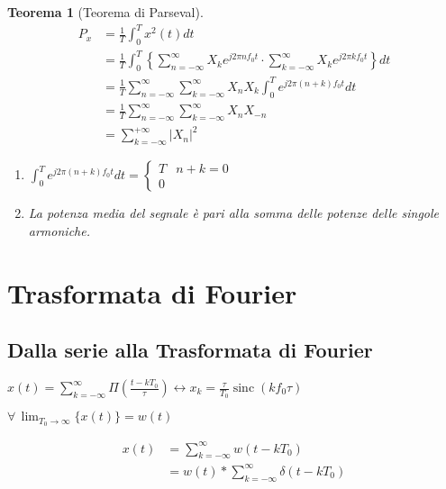\documentclass[a4paper,10pt]{article}
\theoremstyle{mystyle}
\newtheorem{theorem}{Teorema}[section]
\begin{document}
\begin{multicols}{2}
\begin{theorem}[Teorema di Parseval]
    \begin{align*}
        P_x
        &= \frac{1}{T} \int_{0}^{T} x^2 (t) dt \\
        &= \frac{1}{T} \int_{0}^{T} \left\{ \sum_{n=-\infty}^{\infty} X_k e^{j2 \pi n f_0 t}  \cdot \sum_{k=-\infty}^{\infty} X_k e^{j 2 \pi k f_0 t} \right\} dt \\
        &= \frac{1}{T} \sum_{n=-\infty}^{\infty} \sum_{k=-\infty}^{\infty} X_n X_k \int_{0}^{T} e^{j2 \pi (n+k)f_0 t} dt \\
        &= \frac{1}{T} \sum_{n=-\infty}^{\infty} \sum_{k=-\infty}^{\infty} X_n X_{-n} \\
        &= \sum_{k=-\infty}^{+\infty} \lvert X_n \rvert ^2
    \end{align*}

    \begin{enumerate}[label=\roman*.]
        \item
           \(\int_{0}^{T} e^{j 2 \pi (n+k) f_0 t} dt =
           \begin{cases}
            T & n+k=0 \\
            0
           \end{cases}\)
        \item La potenza media del segnale è pari alla somma delle potenze delle singole armoniche.
    \end{enumerate}
\end{theorem}

\newpage

\section{Trasformata di Fourier}

\subsection{Dalla serie alla Trasformata di Fourier}

\(x(t) = \sum_{k=-\infty}^{\infty} \Pi \left( \frac{t- kT_0}{\tau} \right) \leftrightarrow x_k = \frac{\tau}{T_0} \operatorname{sinc} (k f_0 \tau)\)

\(\forall \, \lim_{T_0 \to \infty} \{x(t)\} = w(t)\)

\begin{align*}
    x(t)
    &= \sum_{k=-\infty}^{\infty} w(t-kT_0) \\
    &= w(t) * \sum_{k=-\infty}^{\infty} \delta(t - k T_0)
\end{align*}


\end{multicols}
\end{document}
